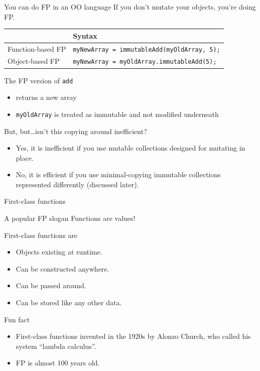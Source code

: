 \begin{frame}[fragile]{You can do FP in an OO language}
  If you don't mutate your objects, you're doing FP.

  \begin{table}
    \begin{tabular}{| l || l |}
      \toprule
      & Syntax \\
      \midrule
        Function-based FP
      & \texttt{myNewArray = immutableAdd(myOldArray, 5);} \\
        Object-based FP
      & \texttt{myNewArray = myOldArray.immutableAdd(5);} \\
      \bottomrule
    \end{tabular}
  \end{table}

  The FP version of \texttt{add}
  \begin{itemize}
  \item returns a new array
  \item \texttt{myOldArray} is treated as immutable and not
    modified underneath
  \end{itemize}

  \begin{alertblock}{But, but\ldots isn't this copying around inefficient?}
    \begin{itemize}
    \item Yes, it is inefficient if you use mutable collections designed for
      mutating in place.
    \item No, it is efficient if you use minimal-copying immutable collections
      represented differently (discussed later).
    \end{itemize}
  \end{alertblock}
\end{frame}

\begin{frame}{First-class functions}
  \begin{block}{A popular FP slogan}
    Functions are values!
  \end{block}

  First-class functions are
  \begin{itemize}
  \item Objects existing at runtime.
  \item Can be constructed anywhere.
  \item Can be passed around.
  \item Can be stored like any other data.
  \end{itemize}

  \begin{block}{Fun fact}
    \begin{itemize}
    \item First-class functions invented in the 1920s by Alonzo Church, who
    called his system ``lambda calculus''.
    \item FP is almost 100 years old.
    \end{itemize}
  \end{block}
\end{frame}

